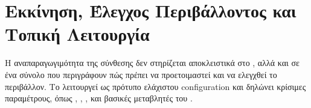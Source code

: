 \section{Εκκίνηση, Έλεγχος Περιβάλλοντος και Τοπική Λειτουργία}
\label{sec:appendix_environment_bootstrap}

Η αναπαραγωγιμότητα της σύνθεσης δεν στηρίζεται αποκλειστικά στο \texttt{},
αλλά και σε ένα σύνολο  που περιγράφουν πώς πρέπει να προετοιμαστεί και να ελεγχθεί το περιβάλλον.
Το \texttt{} λειτουργεί ως πρότυπο ελάχιστου configuration και δηλώνει κρίσιμες παραμέτρους,
όπως , , , 
και βασικές μεταβλητές του .



\begin{table}[H]
\centering
\caption{Κρίσιμα  και  της υποδομής ανάπτυξης}
\label{tab:appendix_volume_env_role_matrix}

\end{table}
